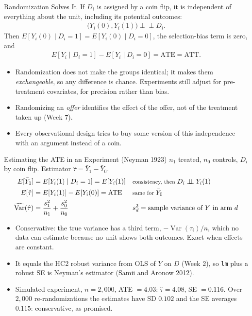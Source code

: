 \documentclass[aspectratio=169,11pt,xcolor=dvipsnames]{beamer}
\newcommand{\srcp}[1]{{\scriptsize\color{gray}(#1)}}
\DeclareMathOperator{\Var}{Var}
\newcommand{\indep}{\perp\!\!\!\perp}
\newcommand{\E}{E}
\newcommand{\core}{\,\raisebox{0.6pt}{\textcolor{corestar}{$\bigstar$}}}
\begin{document}
\begin{frame}{Randomization Solves It\core}
If $D_i$ is assigned by a coin flip, it is independent of everything about
the unit, including its potential outcomes:
\begin{align*}
  \big(Y_i(0), Y_i(1)\big) \indep D_i .
\end{align*}
Then $\E[Y_i(0)\mid D_i=1] = \E[Y_i(0)\mid D_i=0]$, the selection-bias term
is zero, and
\begin{align*}
  \E[Y_i\mid D_i=1] - \E[Y_i\mid D_i=0] = \text{ATE} = \text{ATT} .
\end{align*}
\begin{itemize}\itemsep2pt
  \item Randomization does not make the groups identical; it makes them
        \emph{exchangeable}, so any difference is chance. Experiments still
        adjust for pre-treatment covariates, for precision rather than bias.
  \item Randomizing an \emph{offer} identifies the effect of the offer, not
        of the treatment taken up (Week 7).
  \item Every observational design tries to buy some version of this
        independence with an argument instead of a coin.
\end{itemize}
\end{frame}

\begin{frame}{Estimating the ATE in an Experiment \srcp{Neyman 1923}}
$n_1$ treated, $n_0$ controls, $D_i$ by coin flip. Estimator
$\hat\tau = \bar Y_1 - \bar Y_0$.
\begin{align*}
  \E[\bar Y_1] &= \E[Y_i(1) \mid D_i = 1] = \E[Y_i(1)]
      && \text{\footnotesize consistency, then } D_i \indep Y_i(1) \\
  \E[\hat\tau] &= \E[Y_i(1)] - \E[Y_i(0)] = \text{ATE}
      && \text{\footnotesize same for } \bar Y_0 \\
  \widehat{\Var}(\hat\tau) &= \frac{s_1^2}{n_1} + \frac{s_0^2}{n_0}
      && \text{\footnotesize } s_d^2 = \text{sample variance of } Y \text{ in arm } d
\end{align*}
\begin{itemize}\itemsep3pt
  \item Conservative: the true variance has a third term, $-\Var(\tau_i)/n$,
        which no data can estimate because no unit shows both outcomes.
        Exact when effects are constant.
  \item It equals the HC2 robust variance from OLS of $Y$ on $D$ (Week 2),
        so \texttt{lm} plus a robust SE is Neyman's estimator
        \srcp{Samii and Aronow 2012}.
  \item Simulated experiment, $n = 2{,}000$, ATE $= 4.03$: $\hat\tau = 4.08$,
        SE $= 0.116$. Over $2{,}000$ re-randomizations the estimates have SD
        $0.102$ and the SE averages $0.115$: conservative, as promised.
\end{itemize}
\end{frame}
\end{document}
